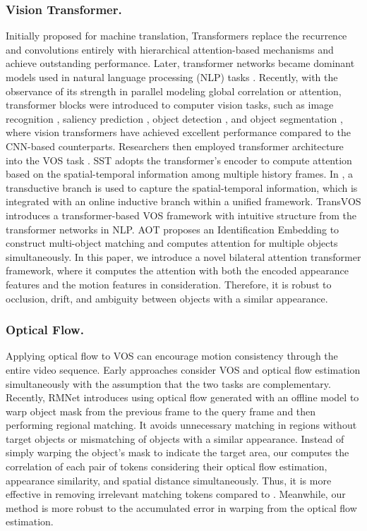 \documentclass[runningheads]{llncs}
\begin{document}
\subsubsection{Vision Transformer.} Initially proposed for machine translation, Transformers \cite{vaswani2017attention} replace the recurrence and convolutions entirely with hierarchical attention-based mechanisms and achieve outstanding performance. Later, transformer networks became dominant models used in natural language processing (NLP) tasks \cite{wolf2020transformers,zaheer2020big}. Recently, with the observance of its strength in parallel modeling global correlation or attention, transformer blocks were introduced to computer vision tasks, such as image recognition \cite{dosovitskiy2020image}, saliency prediction \cite{zhang2021learning}, object detection \cite{zhu2020deformable,carion2020end}, and object segmentation \cite{wang2021end}, where vision transformers have achieved excellent performance compared to the CNN-based counterparts. Researchers then employed transformer architecture into the VOS task \cite{duke2021sstvos,mao2021joint,TransVOS,AOT}.
SST \cite{duke2021sstvos} adopts the transformer's encoder to compute attention based on the spatial-temporal information among multiple history frames. In \cite{mao2021joint}, a transductive branch is used to capture the spatial-temporal information, which is integrated with an online inductive branch within a unified framework. TransVOS \cite{TransVOS} introduces a transformer-based VOS framework with intuitive structure from the transformer networks in NLP. AOT \cite{AOT} proposes an Identification Embedding to construct multi-object matching and computes attention for multiple objects simultaneously.
In this paper, we introduce a novel bilateral attention transformer framework, where it computes the attention with both the encoded appearance features and the motion features in consideration. Therefore, it is robust to occlusion, drift, and ambiguity between objects with a similar appearance. 


\subsubsection{Optical Flow.} Applying optical flow to VOS can encourage motion consistency through the entire video sequence. Early approaches \cite{tsai2016video,xu2018dynamic,SegFlow} consider VOS and optical flow estimation simultaneously with the assumption that the two tasks are complementary.  Recently, RMNet \cite{RMNet} introduces using optical flow generated with an offline model to warp object mask from the previous frame to the query frame and then performing regional matching. It avoids unnecessary matching in regions without target objects or mismatching of objects with a similar appearance. Instead of simply warping the object's mask to indicate the target area, our {\shortname} computes the correlation of each pair of tokens considering their optical flow estimation, appearance similarity, and spatial distance simultaneously. Thus, it is more effective in removing irrelevant matching tokens compared to \cite{RMNet}. Meanwhile, our method is more robust to the accumulated error in warping from the optical flow estimation. 
\end{document}
